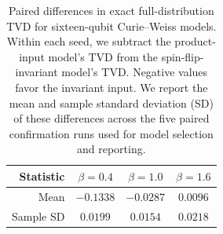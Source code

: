 \begin{table}[!htbp]
\centering
\small
\renewcommand{\arraystretch}{1.12}
\setlength{\tabcolsep}{3pt}
\caption{Paired differences in exact full-distribution TVD for sixteen-qubit Curie--Weiss models. Within each seed, we subtract the product-input model's TVD from the spin-flip-invariant model's TVD. Negative values favor the invariant input. We report the mean and sample standard deviation (SD) of these differences across the five paired confirmation runs used for model selection and reporting.}
\label{tab:cw_symmetry_paired}
\begin{tabular}{rccc}
\toprule
Statistic & $\beta=0.4$ & $\beta=1.0$ & $\beta=1.6$ \\
\midrule
Mean & $-0.1338$ & $-0.0287$ & $0.0096$ \\
Sample SD & $0.0199$ & $0.0154$ & $0.0218$ \\
\bottomrule
\end{tabular}
\end{table}
